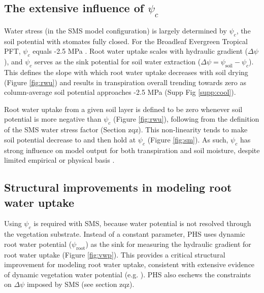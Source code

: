 \documentclass[draft,linenumbers]{agujournal}
\begin{document}
\subsection{The extensive influence of $\psi_c$}
    Water stress (in the SMS model configuration) is largely determined by 
    $\psi_c$, the soil potential with stomates fully closed.
    For the Broadleaf Evergreen Tropical PFT, $\psi_c$ equals -2.5 MPa \citep{oleson2013}.
    Root water uptake scales with hydraulic gradient ($\Delta\psi$), and
    $\psi_c$ serves as the sink potential for soil water extraction ($\Delta\psi = \psi_{\text{soil}}-\psi_c$).
    This defines the slope with which root water uptake decreases with soil drying (Figure \ref{fig:rwu})
    and results in transpiration overall trending towards zero as column-average soil potential approaches -2.5 MPa (Supp Fig \ref{supp:cool}).
    
    Root water uptake from a given soil layer is defined to be zero whenever soil potential is more negative than $\psi_c$ (Figure \ref{fig:rwu}),  
    following from the definition of the SMS water stress factor (Section zqz).
    This non-linearity tends to make soil potential decrease to and then hold at $\psi_c$ (Figure \ref{fig:sm}).
    As such, $\psi_c$ has strong influence on model output for both transpiration and soil moisture, despite limited empirical or physical basis \citep{rogers2017}.
    
\subsection{Structural improvements in modeling root water uptake}

    Using $\psi_c$ is required with SMS, because water potential is not resolved through the vegetation substrate.
    Instead of a constant parameter, PHS uses dynamic root water potential ($\psi_{\text{root}}$) as the sink for measuring the hydraulic gradient for root water uptake (Figure \ref{fig:vwp}).
    This provides a critical structural improvement for modeling root water uptake, consistent with extensive evidence of dynamic vegetation water potential (e.g. \cite{fisher2006}).
    PHS also eschews the constraints on $\Delta\psi$ imposed by SMS (see section zqz).
    
\end{document}
